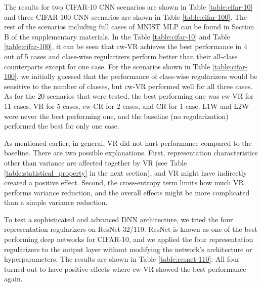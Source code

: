 \documentclass[letterpaper]{article} %
\begin{document}
The results for two CIFAR-10 CNN scenarios are shown in Table \ref{table:cifar-10} and three CIFAR-100 CNN scenarios are shown in Table \ref{table:cifar-100}. The rest of the scenarios including full cases of MNIST MLP can be found in Section B of the supplementary materials. In the Table \ref{table:cifar-10} and Table \ref{table:cifar-100}, it can be seen that cw-VR achieves the best performance in 4 out of 5 cases and class-wise regularizers perform better than their all-class counterparts except for one case. For the scenarios shown in Table \ref{table:cifar-100}, we initially guessed that the performance of class-wise regularizers would be sensitive to the number of classes, but cw-VR performed well for all three cases. As for the 20 scenarios that were tested, the best performing one was cw-VR for 11 cases, VR for 5 cases, cw-CR for 2 cases, and CR for 1 case. L1W and L2W were never the best performing one, and the baseline (no regularization) performed the best for only one case. 

As mentioned earlier, in general, VR did not hurt performance compared to the baseline. There are two possible explanations. First, representation characteristics other than variance are affected together by VR (see Table \ref{table:statistical_property} in the next section), and VR might have indirectly created a positive effect. Second, the cross-entropy term limits how much VR performs variance reduction, and the overall effects might be more complicated than a simple variance reduction.


To test a sophisticated and advanced DNN architecture, we tried the four representation regularizers on ResNet-32/110. ResNet is known as one of the best performing deep networks for CIFAR-10, and we applied the four representation regularizers to the output layer without modifying the network's architecture or hyperparameters. The results are shown in Table \ref{table:resnet-110}. All four turned out to have positive effects where cw-VR showed the best performance again. 
\end{document}

